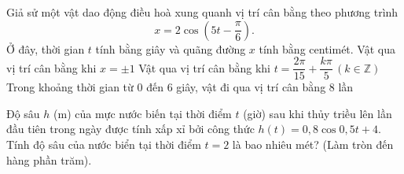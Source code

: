 \begin{vd}%
	Giả sử một vật dao động điều hoà xung quanh vị trí cân bằng theo phương trình
	$$
	x=2 \cos \left(5 t-\dfrac{\pi}{6}\right).
	$$
	Ở đây, thời gian $t$ tính bằng giây và quãng đường $x$ tính bằng centimét. 
	{Vật qua vị trí cân bằng khi $x=\pm 1$}
	{\True Vật qua vị trí cân bằng khi $t=\dfrac{2\pi}{15}+\dfrac{k\pi}{5} \,\left(k\in \mathbb{Z}\right)$}
	{Trong khoảng thời gian từ $ 0 $ đến $ 6 $ giây, vật đi qua vị trí cân bằng $8$ lần}
\end{vd}

\begin{vd}%
	Độ sâu $h$ (m) của mực nước biến tại thời điểm $t$ (giờ) sau khi thủy triều lên lần đầu tiên trong ngày được tính xấp xỉ bởi công thức $h(t)=0{,}8\cos 0{,}5t+4$. Tính độ sâu của nước biển tại thời điểm $t=2$ là bao nhiêu mét? (Làm tròn đến hàng phần trăm).
\end{vd}

